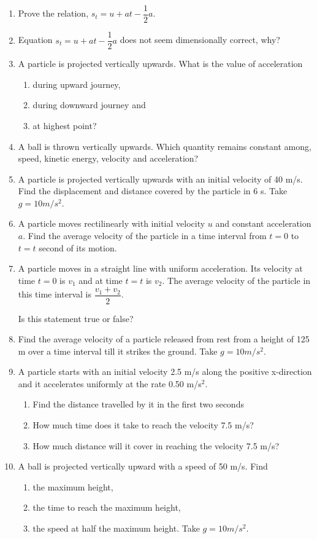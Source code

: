 \documentclass{article}
\renewcommand{\frac}[2]{\dfrac{#1}{#2}}
\begin{document}
\begin{enumerate}
    \item Prove the relation, \(s_t = u + at - \frac{1}{2} a\).
    \item Equation \(s_t = u + at - \frac{1}{2} a\) does not seem dimensionally correct, why?
    \item A particle is projected vertically upwards. What is the value of acceleration
    \begin{enumerate}
        \item during upward journey,
        \item during downward journey and
        \item at highest point?
    \end{enumerate}
    \item A ball is thrown vertically upwards. Which quantity remains constant among, speed, kinetic energy, velocity and acceleration?
    \item A particle is projected vertically upwards with an initial velocity of 40 m/s. Find the displacement and distance covered by the particle in 6 s. Take \(g = 10 m/s^2\).
    \item A particle moves rectilinearly with initial velocity \(u\) and constant acceleration \(a\). Find the average velocity of the particle in a time interval from \(t = 0\) to \(t = t\) second of its motion.
    \item A particle moves in a straight line with uniform acceleration. Its velocity at time \(t = 0\) is \(v_1\) and at time \(t = t\) is \(v_2\). The average velocity of the particle in this time interval is \(\frac{v_1 + v_2}{2}\).
    
    Is this statement true or false?
    \item Find the average velocity of a particle released from rest from a height of 125 m over a time interval till it strikes the ground. Take \(g = 10 m/s^2\).
    \item A particle starts with an initial velocity 2.5 m/s along the positive x-direction and it accelerates uniformly at the rate 0.50 m/s\(^2\).
    \begin{enumerate}
        \item Find the distance travelled by it in the first two seconds
        \item How much time does it take to reach the velocity 7.5 m/s?
        \item How much distance will it cover in reaching the velocity 7.5 m/s?
    \end{enumerate}
    \item A ball is projected vertically upward with a speed of 50 m/s. Find
    \begin{enumerate}
        \item the maximum height,
        \item the time to reach the maximum height,
        \item the speed at half the maximum height. Take \(g = 10 m/s^2\).
    \end{enumerate}
\end{enumerate}
\end{document}
